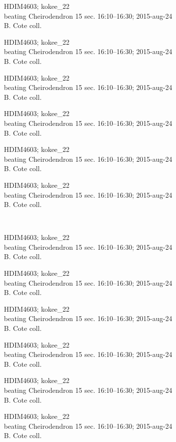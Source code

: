 \documentclass[2pt]{extarticle}
\begin{document}
\noindent
\parbox{0.16\textwidth}{\tiny \raggedright \rule[-0.3\baselineskip]{0pt}{10pt}HDIM4603; kokee\_22\\ beating Cheirodendron 15 sec. 16:10--16:30; 2015-aug-24\\ B. Cote coll.}
\parbox{0.16\textwidth}{\tiny \raggedright \rule[-0.3\baselineskip]{0pt}{10pt}HDIM4603; kokee\_22\\ beating Cheirodendron 15 sec. 16:10--16:30; 2015-aug-24\\ B. Cote coll.}
\parbox{0.16\textwidth}{\tiny \raggedright \rule[-0.3\baselineskip]{0pt}{10pt}HDIM4603; kokee\_22\\ beating Cheirodendron 15 sec. 16:10--16:30; 2015-aug-24\\ B. Cote coll.}
\parbox{0.16\textwidth}{\tiny \raggedright \rule[-0.3\baselineskip]{0pt}{10pt}HDIM4603; kokee\_22\\ beating Cheirodendron 15 sec. 16:10--16:30; 2015-aug-24\\ B. Cote coll.}
\parbox{0.16\textwidth}{\tiny \raggedright \rule[-0.3\baselineskip]{0pt}{10pt}HDIM4603; kokee\_22\\ beating Cheirodendron 15 sec. 16:10--16:30; 2015-aug-24\\ B. Cote coll.}
\parbox{0.16\textwidth}{\tiny \raggedright \rule[-0.3\baselineskip]{0pt}{10pt}HDIM4603; kokee\_22\\ beating Cheirodendron 15 sec. 16:10--16:30; 2015-aug-24\\ B. Cote coll.} \\ 
\vspace{0.001in} 

\noindent
\parbox{0.16\textwidth}{\tiny \raggedright \rule[-0.3\baselineskip]{0pt}{10pt}HDIM4603; kokee\_22\\ beating Cheirodendron 15 sec. 16:10--16:30; 2015-aug-24\\ B. Cote coll.}
\parbox{0.16\textwidth}{\tiny \raggedright \rule[-0.3\baselineskip]{0pt}{10pt}HDIM4603; kokee\_22\\ beating Cheirodendron 15 sec. 16:10--16:30; 2015-aug-24\\ B. Cote coll.}
\parbox{0.16\textwidth}{\tiny \raggedright \rule[-0.3\baselineskip]{0pt}{10pt}HDIM4603; kokee\_22\\ beating Cheirodendron 15 sec. 16:10--16:30; 2015-aug-24\\ B. Cote coll.}
\parbox{0.16\textwidth}{\tiny \raggedright \rule[-0.3\baselineskip]{0pt}{10pt}HDIM4603; kokee\_22\\ beating Cheirodendron 15 sec. 16:10--16:30; 2015-aug-24\\ B. Cote coll.}
\parbox{0.16\textwidth}{\tiny \raggedright \rule[-0.3\baselineskip]{0pt}{10pt}HDIM4603; kokee\_22\\ beating Cheirodendron 15 sec. 16:10--16:30; 2015-aug-24\\ B. Cote coll.}
\parbox{0.16\textwidth}{\tiny \raggedright \rule[-0.3\baselineskip]{0pt}{10pt}HDIM4603; kokee\_22\\ beating Cheirodendron 15 sec. 16:10--16:30; 2015-aug-24\\ B. Cote coll.} \\ 
\vspace{0.001in} 
\end{document}
